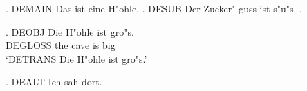 
\usepackage[ngerman]{babel}

\ex. DEMAIN Das ist eine H"ohle.
\a. DESUB Der Zucker"-guss ist s"u"s.
\z.

\exg. DEOBJ Die H"ohle ist gro"s.\\ DEGLOSS the cave is big\\
\glt `DETRANS Die H"ohle ist gro"s.'

\ex. DEALT Ich sah  dort.

